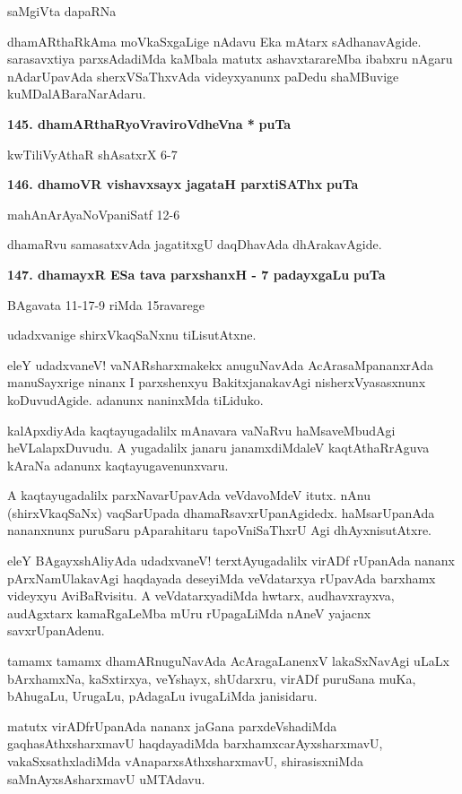 \hfill{saMgiVta dapaRNa}

\smallskip
dhamARthaRkAma moVkaSxgaLige nAdavu Eka mAtarx sAdhanavAgide. sarasavxtiya parxsAdadiMda kaMbala matutx ashavxtarareMba ibabxru nAgaru nAdarUpavAda sherxVSaThxvAda videyxyanunx paDedu shaMBuvige kuMDalA\-BaraNarAdaru.

\medskip
\noindent
\textbf{145. dhamARthaRyoVraviroVdheVna *} \hfill{\bf puTa \pageref{95}}

\hfill{kwTiliVyAthaR shAsatxrX 6-7}

\medskip
\noindent
\textbf{146. dhamoVR vishavxsayx jagataH parxtiSAThx} \hfill{\bf puTa \pageref{63}}

\hfill{mahAnArAyaNoVpaniSatf 12-6}

\smallskip
dhamaRvu samasatxvAda jagatitxgU daqDhavAda dhArakavAgide.

\medskip
\noindent
\textbf{147. dhamayxR ESa tava parxshanxH - 7 padayxgaLu} \hfill{\bf puTa \pageref{145}}

\hfill{BAgavata 11-17-9 riMda 15ravarege}

udadxvanige shirxVkaqSaNxnu tiLisutAtxne.

\smallskip
eleY udadxvaneV! vaNARsharxmakekx anuguNavAda AcArasaMpananxrAda manuSayxrige ninanx I parxshenxyu BakitxjanakavAgi nisherxV\-yasasxnunx koDuvudAgide. adanunx naninxMda tiLiduko.

kalApxdiyAda kaqtayugadalilx mAnavara vaNaRvu haMsaveMbudAgi heVLalapxDuvudu. A yugadalilx janaru janamxdiMdaleV kaqtAthaRrAguva kAraNa adanunx kaqtayugavenunxvaru.

A kaqtayugadalilx parxNavarUpavAda veVdavoMdeV itutx. nAnu (shirxVkaqSaNx) vaqSarUpada dhamaRsavxrUpa\-nAgidedx. haMsarUpanAda nananxnunx puruSaru pAparahitaru tapoVniSaThxrU Agi dhAyxnisutAtxre.

eleY BAgayxshAliyAda udadxvaneV! terxtAyugadalilx virADf rUpanAda nananx pArxNamUlakavAgi haqda\-yada deseyiMda veVdatarxya rUpavAda barxhamx videyxyu AviBaRvisitu. A veVdatarxyadiMda hwtarx, audhavxrayxva, audAgxtarx kamaRgaLeMba mUru rUpagaLiMda nAneV yajacnx savxrUpanAdenu.

tamamx tamamx dhamARnuguNavAda AcAragaLanenxV lakaSxNavAgi uLaLx bArxhamxNa, kaSxtirxya, veYshayx, shUdarxru, virADf puruSana muKa, bAhugaLu, UrugaLu, pAdagaLu ivugaLiMda janisidaru.

matutx virADfrUpanAda nananx jaGana parxdeVshadiMda gaqhasAthxsharxmavU haqdaya\-diMda barxhamxcarAyx\-sharx\-ma\-vU, vakaSxsathxladiMda vAnaparxsAthxsharxmavU, shirasisxniMda saMnAyxsA\-sharxmavU uMTAdavu.

